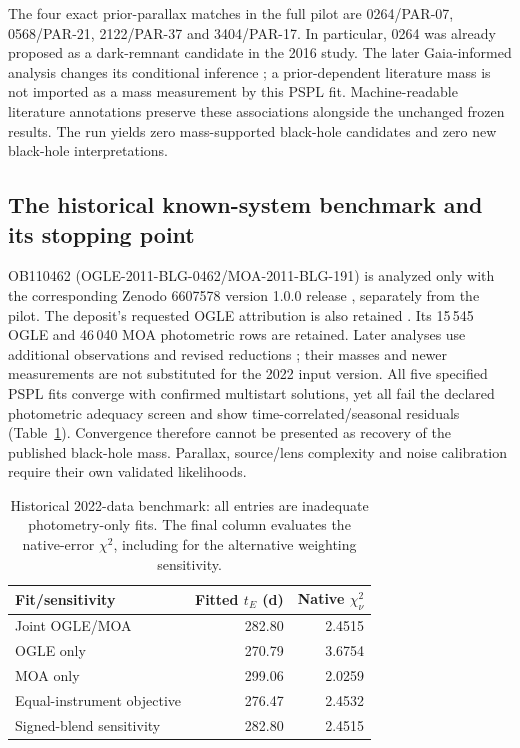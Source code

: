 The four exact prior-parallax matches in the full pilot are
0264/PAR-07, 0568/PAR-21, 2122/PAR-37 and 3404/PAR-17. In particular,
0264 was already proposed as a dark-remnant candidate in the 2016 study.
The later Gaia-informed analysis changes its conditional inference
\cite{Mroz2021}; a prior-dependent literature mass is not imported as
a mass measurement by this PSPL fit. Machine-readable literature
annotations preserve these associations alongside the unchanged frozen
results. The run yields zero mass-supported black-hole candidates and
zero new black-hole interpretations.

\subsection{The historical known-system benchmark and its stopping point}

OB110462 (OGLE-2011-BLG-0462/MOA-2011-BLG-191) is analyzed only with
the corresponding Zenodo 6607578 version 1.0.0 release
\cite{Lam2022Letter,Lam2022Supplement,Lam2022Data}, separately from the
pilot. The deposit's requested OGLE attribution is also retained
\cite{Udalski2015}. Its 15\,545 OGLE and 46\,040 MOA photometric rows
are retained. Later analyses use additional observations and revised
reductions \cite{LamLu2023,Sahu2025}; their masses and newer measurements
are not substituted for the 2022 input version.
All five specified PSPL fits converge with confirmed multistart solutions,
yet all fail the declared photometric adequacy screen and show
time-correlated/seasonal residuals (Table~\ref{tab:historical-benchmark}).
Convergence therefore cannot be presented as recovery of the published
black-hole mass. Parallax, source/lens complexity and noise calibration
require their own validated likelihoods.

\begin{table}[tbp]
\centering\small
\caption{Historical 2022-data benchmark: all entries are inadequate
photometry-only fits. The final column evaluates the native-error
$\chi^2$, including for the alternative weighting sensitivity.}
\label{tab:historical-benchmark}
\begin{tabular}{@{}lrr@{}}
\toprule
Fit/sensitivity & Fitted $t_E$ (d) & Native $\chi^2_\nu$\\
\midrule
Joint OGLE/MOA & 282.80 & 2.4515\\
OGLE only & 270.79 & 3.6754\\
MOA only & 299.06 & 2.0259\\
Equal-instrument objective & 276.47 & 2.4532\\
Signed-blend sensitivity & 282.80 & 2.4515\\
\bottomrule
\end{tabular}
\end{table}

